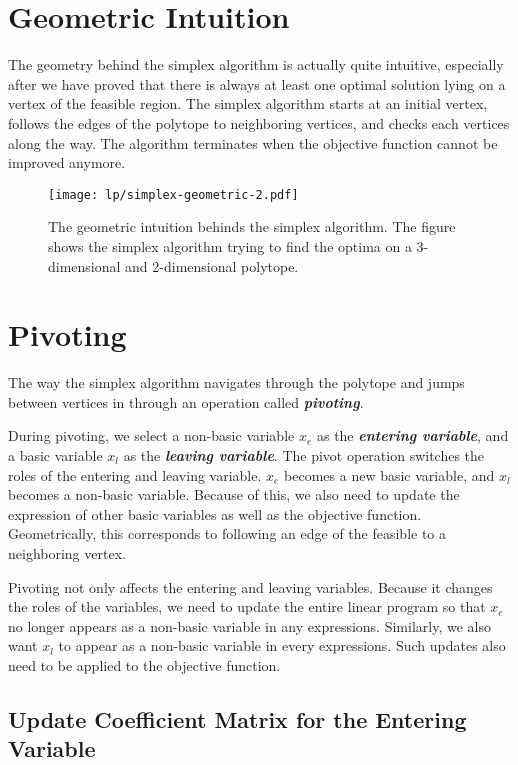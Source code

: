 \section{Geometric Intuition}

The geometry behind the simplex algorithm is actually quite intuitive, especially after we have proved that there is always at least one optimal solution lying on a vertex of the feasible region. The simplex algorithm starts at an initial vertex, follows the edges of the polytope to neighboring vertices, and checks each vertices along the way. The algorithm terminates when the objective function cannot be improved anymore.

\begin{figure}[htbp]
    \centering
    \texttt{[image: lp/simplex-geometric-2.pdf]}
    \caption{The geometric intuition behinds the simplex algorithm. The figure shows the simplex algorithm trying to find the optima on a 3-dimensional and 2-dimensional polytope.}
    \label{fig:simplex-geometric}
\end{figure}

\section{Pivoting}

The way the simplex algorithm navigates through the polytope and jumps between vertices in through an operation called \textit{\textbf{pivoting}}.

During pivoting, we select a non-basic variable $x_e$ as the \textit{\textbf{entering variable}}, and a basic variable $x_l$ as the \textit{\textbf{leaving variable}}. The pivot operation switches the roles of the entering and leaving variable. $x_e$ becomes a new basic variable, and $x_l$ becomes a non-basic variable. Because of this, we also need to update the expression of other basic variables as well as the objective function. Geometrically, this corresponds to following an edge of the feasible to a neighboring vertex.

Pivoting not only affects the entering and leaving variables. Because it changes the roles of the variables, we need to update the entire linear program so that $x_e$ no longer appears as a non-basic variable in any expressions. Similarly, we also want $x_l$ to appear as a non-basic variable in every expressions. Such updates also need to be applied to the objective function.

\subsection{Update Coefficient Matrix for the Entering Variable}


